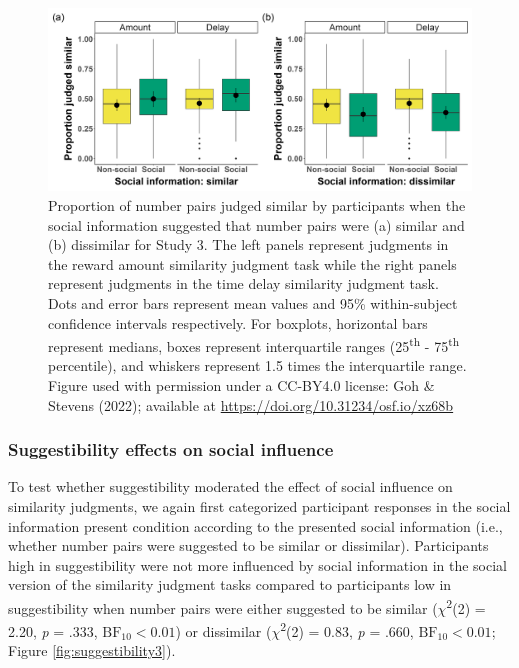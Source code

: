 \documentclass[
  pub,floatsintext]{apa6}
\begin{document}
\begin{figure}
\includegraphics[width=1\linewidth]{figures/judgments_socialinfo_combined_3} \caption{Proportion of number pairs judged similar by participants when the social information suggested that number pairs were (a) similar and (b) dissimilar for Study 3. The left panels represent judgments in the reward amount similarity judgment task while the right panels represent judgments in the time delay similarity judgment task. Dots and error bars represent mean values and 95\% within-subject confidence intervals respectively. For boxplots, horizontal bars represent medians, boxes represent interquartile ranges (25\textsuperscript{th} - 75\textsuperscript{th} percentile), and whiskers represent 1.5 times the interquartile range. Figure used with permission under a CC-BY4.0 license: Goh \& Stevens (2022); available at \url{https://doi.org/10.31234/osf.io/xz68b}}\label{fig:judgmentssocialinfo3}
\end{figure}

\hypertarget{suggestibility-effects-on-social-influence-2}{%
\subsubsection{Suggestibility effects on social influence}\label{suggestibility-effects-on-social-influence-2}}

To test whether suggestibility moderated the effect of social influence on similarity judgments, we again first categorized participant responses in the social information present condition according to the presented social information (i.e., whether number pairs were suggested to be similar or dissimilar). Participants high in suggestibility were not more influenced by social information in the social version of the similarity judgment tasks compared to participants low in suggestibility when number pairs were either suggested to be similar (\(\chi\)\textsuperscript{2}(2) = 2.20, \emph{p} = .333, \(\mathrm{BF}_{\textrm{10}} < 0.01\)) or dissimilar (\(\chi\)\textsuperscript{2}(2) = 0.83, \emph{p} = .660, \(\mathrm{BF}_{\textrm{10}} < 0.01\); Figure \ref{fig:suggestibility3}).
\end{document}
